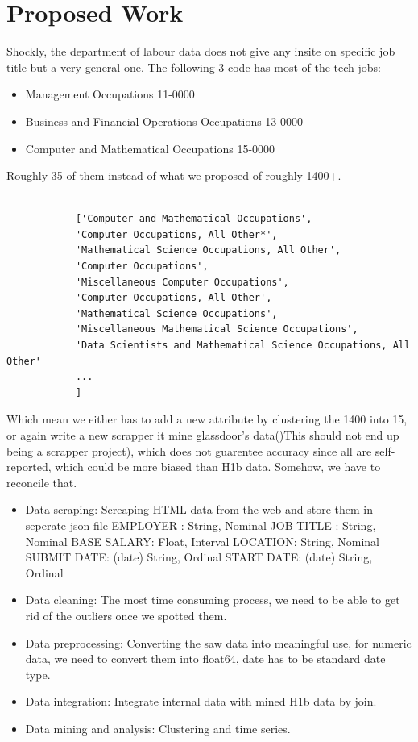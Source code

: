 \section{Proposed Work }
Shockly, the department of labour data does not give any insite on specific job title but a very general one. The following 3 code has most of the tech jobs: 
\begin{itemize}
	\item Management Occupations 11-0000
	\item Business and Financial Operations Occupations 13-0000
	\item Computer and Mathematical Occupations 15-0000
\end{itemize}
Roughly 35 of them instead of what we proposed of roughly 1400+. 
{\small {\begin{verbatim}
			
			['Computer and Mathematical Occupations',
			'Computer Occupations, All Other*',
			'Mathematical Science Occupations, All Other',
			'Computer Occupations',
			'Miscellaneous Computer Occupations',
			'Computer Occupations, All Other',
			'Mathematical Science Occupations',
			'Miscellaneous Mathematical Science Occupations',
			'Data Scientists and Mathematical Science Occupations, All Other'
			...
			]
\end{verbatim}}}
Which mean we either has to add a new attribute by clustering the 1400 into 15, or again write a new scrapper it mine glassdoor's data()This should not end up being a scrapper project), which does not guarentee accuracy since all are self-reported, which could be more biased than H1b data. Somehow, we have to reconcile that. 
\begin{itemize}
	\item Data scraping: Screaping HTML data from the web and store them in seperate json file
	\subitem EMPLOYER :  String, Nominal
	\subitem JOB TITLE :  String, Nominal
	\subitem BASE SALARY:  Float, Interval
	\subitem LOCATION:   String,  Nominal
	\subitem SUBMIT DATE:  (date) String, Ordinal
	\subitem START DATE:  (date) String, Ordinal
	\item Data cleaning: The most time consuming process, we need to be able to get rid of the outliers once we spotted them.
	\item Data preprocessing: Converting the saw data into meaningful use, for numeric data, we  need to convert them into float64, date has to be standard date type.
	\item Data integration: Integrate internal data with mined H1b data by join.
	\item Data mining and analysis: Clustering and time series. 
\end{itemize}
